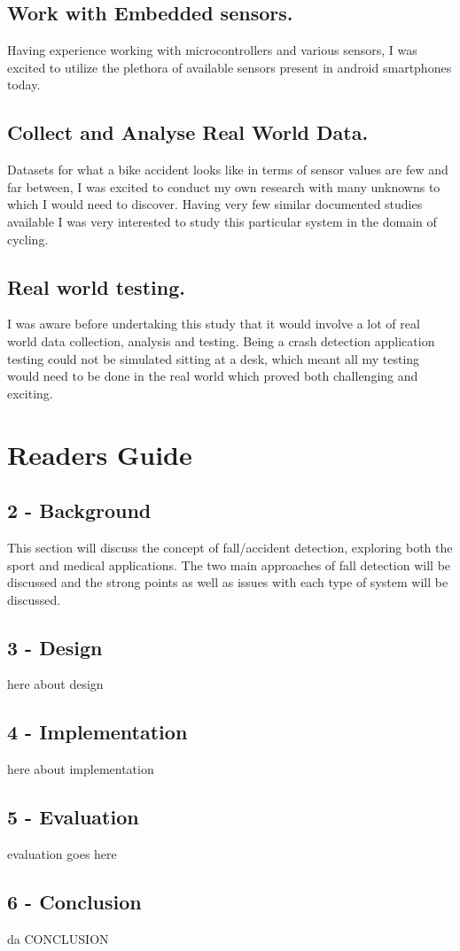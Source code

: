 \subsection*{Work with Embedded sensors.}
Having experience working with microcontrollers and various sensors, I was excited to utilize the plethora of available sensors present in android smartphones today. 

\subsection*{Collect and Analyse Real World Data.}
Datasets for what a bike accident looks like in terms of sensor values are few and far between, I was excited to conduct my own research with many unknowns to which I would need to discover. Having very few similar documented studies available I was very interested to study this particular system in the domain of cycling.  

\subsection*{Real world testing.}
I was aware before undertaking this study that it would involve a lot of real world data collection, analysis and testing. Being a crash detection application testing could not be simulated sitting at a desk, which meant all my testing would need to be done in the real world which proved both challenging and exciting.


\section{Readers Guide}
\subsection* {2 - Background}
This section will discuss the concept of fall/accident detection, exploring both the sport and medical applications. The two main approaches of fall detection will be discussed and the strong points as well as issues with each type of system will be discussed.

\subsection* {3 - Design}

here about design 

\subsection* {4 - Implementation}
here about implementation

\subsection* {5 - Evaluation}

evaluation goes here 

\subsection* {6 - Conclusion}

da CONCLUSION



